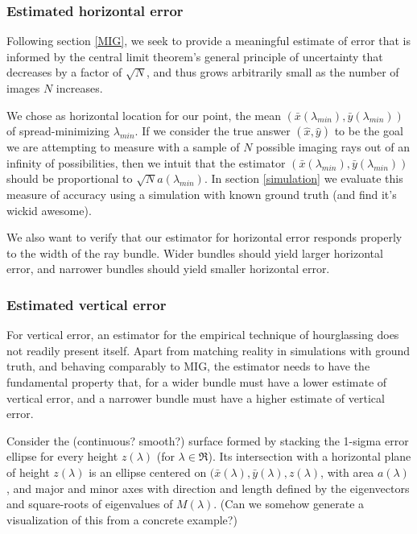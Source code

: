 \documentclass{article}
\begin{document}
\subsubsection{Estimated horizontal error}
Following section \ref{MIG}, we seek to provide a meaningful estimate
of error that is informed by the central limit theorem's general
principle of uncertainty that decreases by a factor of $\sqrt{N}$, and
thus grows arbitrarily small as the number of images $N$ increases.

We chose as horizontal location for our point, the mean
$(\bar{x}(\lambda_{min}),\bar{y}(\lambda_{min}))$ of spread-minimizing
$\lambda_{min}$. If we consider the true answer $(\hat{x},\hat{y})$ to
be the goal we are attempting to measure with a sample of $N$ possible
imaging rays out of an infinity of possibilities, then we intuit that
the estimator $(\bar{x}(\lambda_{min}),\bar{y}(\lambda_{min}))$ should
be proportional to $\sqrt{N}a(\lambda_{min})$. In section
\ref{simulation} we evaluate this measure of accuracy using a
simulation with known ground truth (and find it's wickid awesome).

We also want to verify that our estimator for horizontal error
responds properly to the width of the ray bundle. Wider bundles should
yield larger horizontal error, and narrower bundles should yield
smaller horizontal error.

\subsubsection{Estimated vertical error}
For vertical error, an estimator for the empirical technique of
hourglassing does not readily present itself. Apart from matching
reality in simulations with ground truth, and behaving comparably to
MIG, the estimator needs to have the fundamental property that, for a
wider bundle must have a lower estimate of vertical error, and a
narrower bundle must have a higher estimate of vertical error.

Consider the (continuous? smooth?) surface formed by stacking the
1-sigma error ellipse for every height $z(\lambda)$ (for
$\lambda\in\Re$). Its intersection with a horizontal plane of height
$z(\lambda)$ is an ellipse centered on
$(\bar{x}(\lambda),\bar{y}(\lambda),z(\lambda)$, with area
$a(\lambda)$, and major and minor axes with direction and length
defined by the eigenvectors and square-roots of eigenvalues of
$M(\lambda)$. (Can we somehow generate a visualization of this from a
concrete example?)
\end{document}
